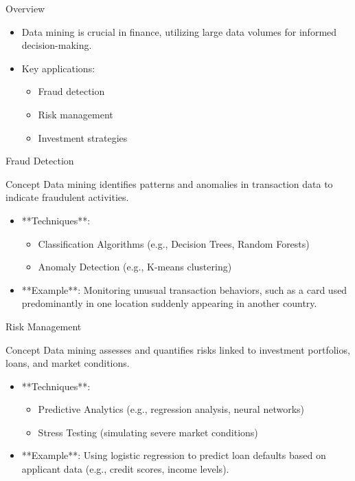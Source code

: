 \documentclass[aspectratio=169]{beamer}
\begin{document}
\begin{frame}{Overview}
    \begin{itemize}
        \item Data mining is crucial in finance, utilizing large data volumes for informed decision-making.
        \item Key applications:
        \begin{itemize}
            \item Fraud detection
            \item Risk management
            \item Investment strategies
        \end{itemize}
    \end{itemize}
\end{frame}

\begin{frame}{Fraud Detection}
    \begin{block}{Concept}
        Data mining identifies patterns and anomalies in transaction data to indicate fraudulent activities.
    \end{block}
    \begin{itemize}
        \item **Techniques**:
        \begin{itemize}
            \item Classification Algorithms (e.g., Decision Trees, Random Forests)
            \item Anomaly Detection (e.g., K-means clustering)
        \end{itemize}
        \item **Example**: Monitoring unusual transaction behaviors, such as a card used predominantly in one location suddenly appearing in another country.
    \end{itemize}
\end{frame}

\begin{frame}{Risk Management}
    \begin{block}{Concept}
        Data mining assesses and quantifies risks linked to investment portfolios, loans, and market conditions.
    \end{block}
    \begin{itemize}
        \item **Techniques**:
        \begin{itemize}
            \item Predictive Analytics (e.g., regression analysis, neural networks)
            \item Stress Testing (simulating severe market conditions)
        \end{itemize}
        \item **Example**: Using logistic regression to predict loan defaults based on applicant data (e.g., credit scores, income levels).
    \end{itemize}
\end{frame}
\end{document}
